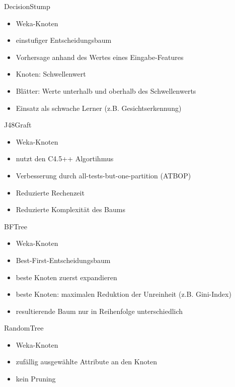 \documentclass[
	handout,
  	aspectratio=169
]{beamer}
\begin{document}
		\begin{frame}{DecisionStump}		
			\begin{itemize}
				\item Weka-Knoten
				\item einstufiger Entscheidungsbaum
				\item Vorhersage anhand des Wertes eines Eingabe-Features
				\item Knoten: Schwellenwert
				\item Blätter: Werte unterhalb und oberhalb des Schwellenwerts
				\item Einsatz als \glqq{}schwache Lerner\grqq{} (z.B. Gesichtserkennung)
			\end{itemize}
		\end{frame}

		\begin{frame}{J48Graft}	
			\begin{itemize}
				\item Weka-Knoten
				\item nutzt den C4.5++ Algortihmus
				\item Verbesserung durch \glqq{}all-tests-but-one-partition\grqq{} (ATBOP)
				\item Reduzierte Rechenzeit
				\item Reduzierte Komplexität des Baums
			\end{itemize}	
		\end{frame}

		\begin{frame}{BFTree}	
			\begin{itemize}
				\item Weka-Knoten
				\item Best-First-Entscheidungsbaum
				\item \glqq{}beste\grqq{} Knoten zuerst expandieren
				\item \glqq{}beste\grqq{} Knoten: maximalen Reduktion der Unreinheit (z.B. Gini-Index)
				\item resultierende Baum nur in Reihenfolge unterschiedlich
			\end{itemize}		
		\end{frame}

		\begin{frame}{RandomTree}	
			\begin{itemize}
				\item Weka-Knoten
				\item zufällig ausgewählte Attribute an den Knoten
				\item kein Pruning
			\end{itemize}		
		\end{frame}
\end{document}
